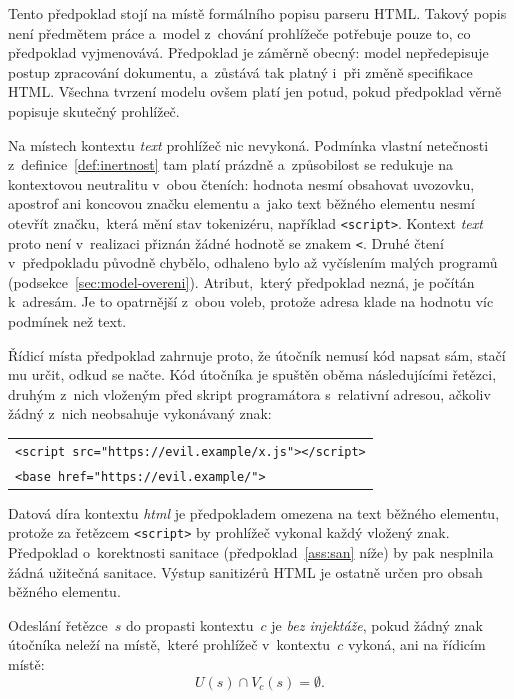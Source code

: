 Tento předpoklad stojí na místě formálního popisu parseru HTML. Takový popis není předmětem práce a~model z~chování prohlížeče potřebuje pouze to, co předpoklad vyjmenovává. Předpoklad je záměrně obecný: model nepředepisuje postup zpracování dokumentu, a~zůstává tak platný i~při změně specifikace HTML. Všechna tvrzení modelu ovšem platí jen potud, pokud předpoklad věrně popisuje skutečný prohlížeč.

Na místech kontextu \emph{text} prohlížeč nic nevykoná. Podmínka vlastní netečnosti z~definice~\ref{def:inertnost} tam platí prázdně a~způsobilost se redukuje na kontextovou neutralitu v~obou čteních: hodnota nesmí obsahovat uvozovku, apostrof ani koncovou značku elementu a~jako text běžného elementu nesmí otevřít značku,~která mění stav tokenizéru, například \texttt{<script>}. Kontext \emph{text} proto není v~realizaci přiznán žádné hodnotě se znakem \texttt{<}. Druhé čtení v~předpokladu původně chybělo, odhaleno bylo až vyčíslením malých programů (podsekce~\ref{sec:model-overeni}). Atribut,~který předpoklad nezná, je počítán k~adresám. Je to opatrnější z~obou voleb, protože adresa klade na hodnotu víc podmínek než text.

Řídicí místa předpoklad zahrnuje proto, že útočník nemusí kód napsat sám, stačí mu určit, odkud se načte. Kód útočníka je spuštěn oběma následujícími řetězci, druhým z~nich vloženým před skript programátora s~relativní adresou, ačkoliv žádný z~nich neobsahuje vykonávaný znak:
\begin{center}
    \begin{tabular}{@{}l@{}}
        \texttt{<script src="https://evil.example/x.js"></script>}\\
        \texttt{<base href="https://evil.example/">}
    \end{tabular}
\end{center}

Datová díra kontextu \emph{html} je předpokladem omezena na text běžného elementu, protože za řetězcem \verb|<script>| by prohlížeč vykonal každý vložený znak. Předpoklad o~korektnosti sanitace (předpoklad~\ref{ass:san} níže) by pak nesplnila žádná užitečná sanitace. Výstup sanitizérů HTML je ostatně určen pro obsah běžného elementu.

\begin{definice}
\label{def:bezinjektaze}
Odeslání řetězce~$s$ do propasti kontextu~$c$ je \emph{bez injektáže}, pokud žádný znak útočníka neleží na místě,~které prohlížeč v~kontextu~$c$ vykoná, ani na řídicím místě:
\[
    U(s) \cap V_c(s) = \emptyset .
\]
\end{definice}

